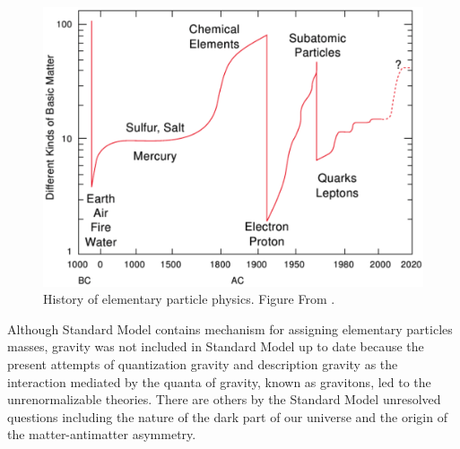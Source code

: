 \documentclass[a4paper,11pt,twoside,openright]{book}
\begin{document}
\begin{figure}[t]
  \centering
  \includegraphics[width=\textwidth]{Introduction/HistoryOfElementaryParticlePhysics.png}
  \caption{History of elementary particle physics. Figure From
    \cite{LatticeQCDForPedestrians}.}
  \label{fig:HistoryOfElPartPhysics}
\end{figure}

Although Standard Model contains mechanism for assigning elementary particles
masses, gravity was not included in Standard Model up to date because the
present attempts of quantization gravity and description gravity as the
interaction mediated by the quanta of gravity, known as gravitons, led to the
unrenormalizable theories. There are others by the Standard Model unresolved
questions including the nature of the dark part of our universe and the origin
of the matter-antimatter asymmetry. 



\end{document}

